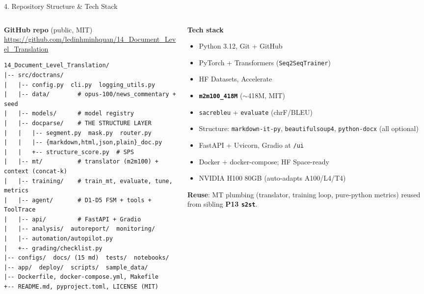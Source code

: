 \documentclass[10pt,aspectratio=169]{beamer}
\begin{document}
\begin{frame}[fragile]{4. Repository Structure \& Tech Stack}
\begin{columns}[T]
\begin{column}{0.55\textwidth}
\textbf{GitHub repo} (public, MIT) \\
\scriptsize \url{https://github.com/ledinhminhquan/14_Document_Level_Translation}

\vspace{0.15cm}
\begin{lstlisting}[basicstyle=\ttfamily\tiny]
14_Document_Level_Translation/
|-- src/doctrans/
|   |-- config.py  cli.py  logging_utils.py
|   |-- data/        # opus-100/news_commentary + seed
|   |-- models/      # model registry
|   |-- docparse/    # THE STRUCTURE LAYER
|   |   |-- segment.py  mask.py  router.py
|   |   |-- {markdown,html,json,plain}_doc.py
|   |   +-- structure_score.py  # SPS
|   |-- mt/          # translator (m2m100) + context (concat-k)
|   |-- training/    # train_mt, evaluate, tune, metrics
|   |-- agent/       # D1-D5 FSM + tools + ToolTrace
|   |-- api/         # FastAPI + Gradio
|   |-- analysis/  autoreport/  monitoring/
|   |-- automation/autopilot.py
|   +-- grading/checklist.py
|-- configs/  docs/ (15 md)  tests/  notebooks/
|-- app/  deploy/  scripts/  sample_data/
|-- Dockerfile, docker-compose.yml, Makefile
+-- README.md, pyproject.toml, LICENSE (MIT)
\end{lstlisting}
\end{column}
\begin{column}{0.45\textwidth}
\textbf{Tech stack}
\begin{itemize}\small
  \item Python 3.12, Git + GitHub
  \item PyTorch + Transformers (\texttt{Seq2SeqTrainer})
  \item HF Datasets, Accelerate
  \item \textbf{\texttt{m2m100\_418M}} ($\sim$418M, MIT)
  \item \texttt{sacrebleu} + \texttt{evaluate} (chrF/BLEU)
  \item Structure: \texttt{markdown-it-py}, \texttt{beautifulsoup4}, \texttt{python-docx} (all optional)
  \item FastAPI + Uvicorn, Gradio at \texttt{/ui}
  \item Docker + docker-compose; HF Space-ready
  \item NVIDIA H100 80GB (auto-adapts A100/L4/T4)
\end{itemize}
\textbf{Reuse}: MT plumbing (translator, training loop, pure-python metrics) reused from sibling \textbf{P13 \texttt{s2st}}.
\end{column}
\end{columns}
\end{frame}
\end{document}
